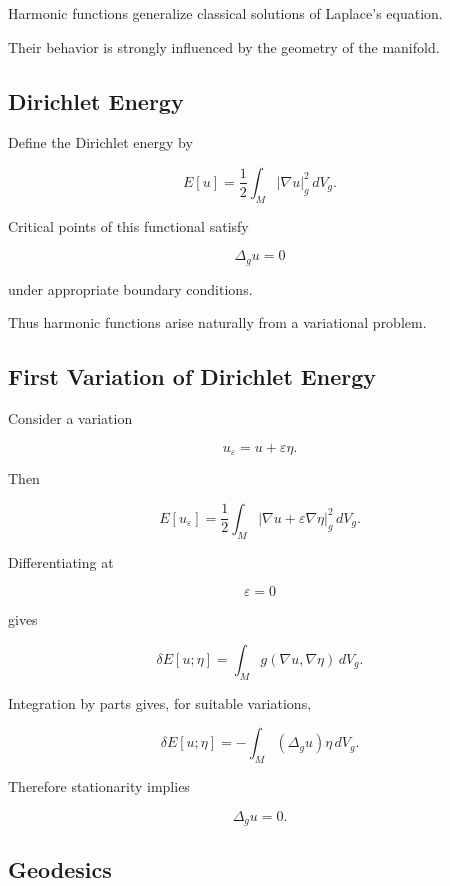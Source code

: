 Harmonic functions generalize classical solutions of Laplace's equation.

Their behavior is strongly influenced by the geometry of the manifold.

\subsection{Dirichlet Energy}
\label{subsec:geometric-dirichlet-energy}

Define the Dirichlet energy by

\[
\boxed{
E[u]
=
\frac12
\int_M
|\nabla u|_g^2
\,dV_g.
}
\]

Critical points of this functional satisfy

\[
\boxed{
\Delta_g u=0
}
\]

under appropriate boundary conditions.

Thus harmonic functions arise naturally from a variational problem.

\subsection{First Variation of Dirichlet Energy}
\label{subsec:first-variation-dirichlet}

Consider a variation

\[
u_\varepsilon
=
u+\varepsilon\eta.
\]

Then

\[
E[u_\varepsilon]
=
\frac12
\int_M
|\nabla u+\varepsilon\nabla\eta|_g^2
\,dV_g.
\]

Differentiating at

\[
\varepsilon=0
\]

gives

\[
\boxed{
\delta E[u;\eta]
=
\int_M
g(\nabla u,\nabla\eta)
\,dV_g.
}
\]

Integration by parts gives, for suitable variations,

\[
\boxed{
\delta E[u;\eta]
=
-
\int_M
(\Delta_g u)\eta
\,dV_g.
}
\]

Therefore stationarity implies

\[
\boxed{
\Delta_g u=0.
}
\]

\subsection{Geodesics}
\label{subsec:geometric-analysis-geodesics}

